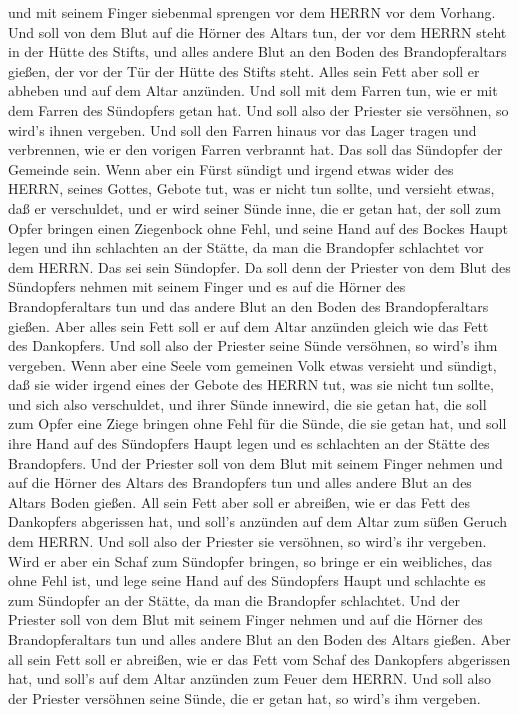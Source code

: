  und mit seinem Finger siebenmal sprengen vor dem HERRN vor
dem Vorhang.  Und soll von dem Blut auf die Hörner des
Altars tun, der vor dem HERRN steht in der Hütte des Stifts, und alles
andere Blut an den Boden des Brandopferaltars gießen, der vor der Tür
der Hütte des Stifts steht.  Alles sein Fett aber soll er
abheben und auf dem Altar anzünden.  Und soll mit dem
Farren tun, wie er mit dem Farren des Sündopfers getan hat. Und soll
also der Priester sie versöhnen, so wird's ihnen vergeben. 
Und soll den Farren hinaus vor das Lager tragen und verbrennen, wie er
den vorigen Farren verbrannt hat. Das soll das Sündopfer der Gemeinde
sein.  Wenn aber ein Fürst sündigt und irgend etwas wider
des HERRN, seines Gottes, Gebote tut, was er nicht tun sollte, und
versieht etwas, daß er verschuldet,  und er wird seiner
Sünde inne, die er getan hat, der soll zum Opfer bringen einen
Ziegenbock ohne Fehl,  und seine Hand auf des Bockes Haupt
legen und ihn schlachten an der Stätte, da man die Brandopfer schlachtet
vor dem HERRN. Das sei sein Sündopfer.  Da soll denn der
Priester von dem Blut des Sündopfers nehmen mit seinem Finger und es auf
die Hörner des Brandopferaltars tun und das andere Blut an den Boden des
Brandopferaltars gießen.  Aber alles sein Fett soll er auf
dem Altar anzünden gleich wie das Fett des Dankopfers. Und soll also der
Priester seine Sünde versöhnen, so wird's ihm vergeben. 
Wenn aber eine Seele vom gemeinen Volk etwas versieht und sündigt, daß
sie wider irgend eines der Gebote des HERRN tut, was sie nicht tun
sollte, und sich also verschuldet,  und ihrer Sünde
innewird, die sie getan hat, die soll zum Opfer eine Ziege bringen ohne
Fehl für die Sünde, die sie getan hat,  und soll ihre Hand
auf des Sündopfers Haupt legen und es schlachten an der Stätte des
Brandopfers.  Und der Priester soll von dem Blut mit seinem
Finger nehmen und auf die Hörner des Altars des Brandopfers tun und
alles andere Blut an des Altars Boden gießen.  All sein
Fett aber soll er abreißen, wie er das Fett des Dankopfers abgerissen
hat, und soll's anzünden auf dem Altar zum süßen Geruch dem HERRN. Und
soll also der Priester sie versöhnen, so wird's ihr vergeben.
 Wird er aber ein Schaf zum Sündopfer bringen, so bringe er
ein weibliches, das ohne Fehl ist,  und lege seine Hand auf
des Sündopfers Haupt und schlachte es zum Sündopfer an der Stätte, da
man die Brandopfer schlachtet.  Und der Priester soll von
dem Blut mit seinem Finger nehmen und auf die Hörner des
Brandopferaltars tun und alles andere Blut an den Boden des Altars
gießen.  Aber all sein Fett soll er abreißen, wie er das
Fett vom Schaf des Dankopfers abgerissen hat, und soll's auf dem Altar
anzünden zum Feuer dem HERRN. Und soll also der Priester versöhnen seine
Sünde, die er getan hat, so wird's ihm vergeben.


